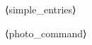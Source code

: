 \documentclass{resume}
\begin{document}

\sepspace
⟨simple_entries⟩

\vspace{1.5ex}
⟨photo_command⟩
\end{document}
